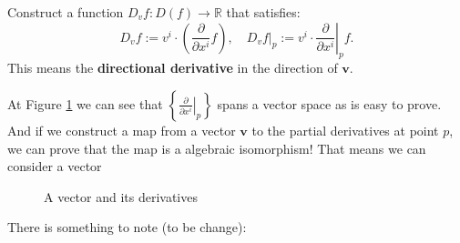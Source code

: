 \begin{definition}
	Construct a function $D_vf: D(f)\to\mathbb{R}$ that satisfies:
	\[
		D_{v}f := v^i\cdot \left(\frac{\partial}{\partial x^i}f\right), \quad
		\left.D_vf\right|_p := v^i\cdot \left.\frac{\partial}{\partial x^i}\right|_p f.
	\]
	This means the \textbf{directional derivative} in the direction of $\mathbf{v}$.
\end{definition}

At Figure \ref{dirder} we can see that $\left\{\left.\frac{\partial}{\partial x^i}\right|_p\right\}$ spans a vector space as is easy to prove.
And if we construct a map from a vector $\mathbf{v}$ to the partial derivatives at point $p$, we can prove that the map is a algebraic isomorphism!
That means we can consider a vector



\begin{figure}[!ht]
	\centering
    
    \caption{A vector and its derivatives}
    \label{dirder}
\end{figure}



There is something to note (to be change):

